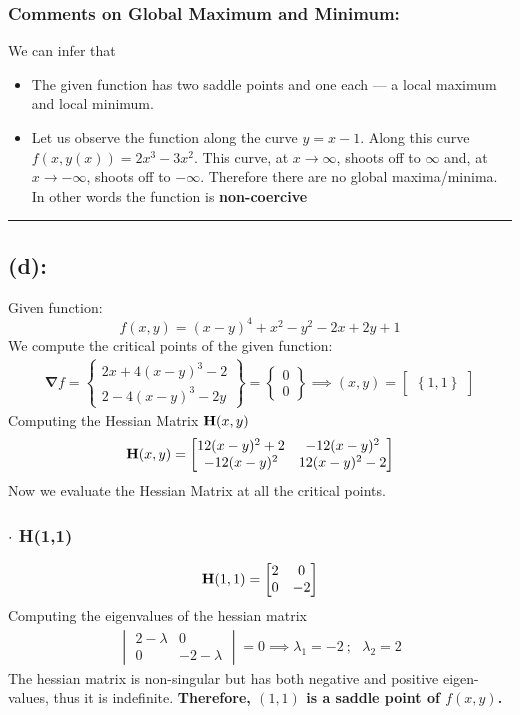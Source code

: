 \subsubsection*{Comments on Global Maximum and Minimum: }
We can infer that
\begin{itemize}
\item The given function has two saddle points and one each --- a local maximum and local minimum. 
\item Let us observe the function along the curve $y=x-1$. Along this curve $f(x,y(x)) = 2x^3 - 3x^2$. This curve, at $x\rightarrow\infty$, shoots off to $\infty$ and, at $x\rightarrow-\infty$, shoots off to $-\infty$. Therefore there are no global maxima/minima. In other words the function is {\bf non-coercive}
\end{itemize}\hrule 
\subsection*{(d): }
Given function:
\[
f(x,y)
=
(x-y)^4 + x^2 - y^2 -2x + 2y + 1
\]
We compute the critical points of the given function: 
\begin{align*}
\bm\nabla f
=
\begin{Bmatrix}
2x+4(x-y)^3-2 \\
2-4(x-y)^3-2y
\end{Bmatrix}
=
\begin{Bmatrix}
0\\0
\end{Bmatrix}\implies (x,y) = \begin{bmatrix}
\left\{1,1 \right\} 
\end{bmatrix}
\end{align*}
Computing the Hessian Matrix ${\bf H}(x,y)$
\begin{align*}
{\bf H}(x,y) = 
\begin{bmatrix}
12(x-y)^2+2 & -12(x-y)^2 \\
-12(x-y)^2 & 12(x-y)^2-2
\end{bmatrix}
\end{align*}
Now we evaluate the Hessian Matrix at all the critical points.
\subsubsection*{$\bm\cdot$ H(1,1)}
\begin{align*}
{\bf H} (1,1) =
\begin{bmatrix}
2 & 0 \\
0 & -2
\end{bmatrix}
\end{align*}
Computing the eigenvalues of the hessian matrix
\begin{align*}
\begin{vmatrix}
2-\lambda & 0 \\
0 & -2-\lambda
\end{vmatrix} = 0 \implies \lambda_1 = -2\ ; \ \ \ \lambda_2 = 2
\end{align*}
The hessian matrix is non-singular but has both negative and positive eigen-values, thus it is indefinite. {\bf Therefore, $(1,1)$ is a saddle point of $f(x,y)$.} 
